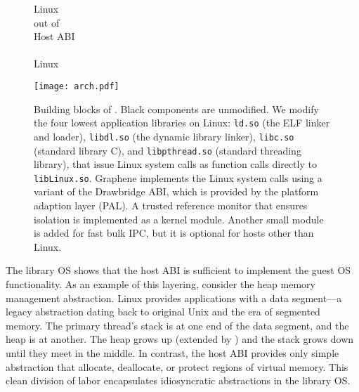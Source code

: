 \begin{figure}[t]
\centering
\begin{minipage}[b]{1.25in}
\footnotesize
\raggedleft
Linux \linuxapis{} \\
\graphenesyscallnum{} out of \linuxsyscallnum{}\\
\vspace{0.1in}
Host ABI \\
\palcallnum{} \hostapis{}\\
\vspace{0.2in}
\hostsyscallnum{} Linux \linuxapis{}
\vspace{0.35in}
\end{minipage}
\hspace{-1.25in}
\texttt{[image: arch.pdf]}
\caption{Building blocks of \graphene{}.  Black components are unmodified.
We modify the four lowest application libraries on Linux:
{\tt ld.so} (the ELF linker and loader),
{\tt libdl.so} (the dynamic library linker),
{\tt libc.so} (standard library C),
and {\tt libpthread.so} (standard threading library), that issue Linux system calls as function calls directly to {\tt libLinux.so}.
Graphene implements the Linux system calls using a variant of the Drawbridge ABI, which is provided by the platform adaption layer (PAL).
A trusted reference monitor that ensures \libos{} isolation is implemented as a kernel module. Another small module is added for fast bulk IPC, but it is optional for hosts other than Linux.}
\label{fig:overview:arch}
\end{figure}


The library OS shows that the host ABI is sufficient to implement the guest OS functionality.
As an example of this layering, consider the heap memory management abstraction. Linux provides applications with a data segment---a legacy abstraction dating back to original Unix and the era of segmented memory. The primary thread's stack is at one end of the data segment, and the heap is at another.  The heap grows up (extended by ) and the stack grows down until they meet in the middle.
In contrast, the host ABI provides only simple abstraction that allocate, deallocate, or protect regions of virtual memory.
This clean division of labor encapsulates idiosyncratic abstractions
in the library OS.



